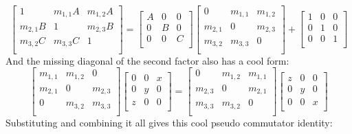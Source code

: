 \[
	\begin{bmatrix}
		1&m_{1,1}A&m_{1,2}A\\
		m_{2,1}B&1&m_{2,3}B\\
		m_{3,2}C&m_{3,3}C&1\\
	\end{bmatrix}
	=
	\begin{bmatrix}
		A&0&0\\
		0&B&0\\
		0&0&C\\
	\end{bmatrix}
	\begin{bmatrix}
		0&m_{1,1}&m_{1,2}\\
		m_{2,1}&0&m_{2,3}\\
		m_{3,2}&m_{3,3}&0\\
	\end{bmatrix}
	+
	\begin{bmatrix}
		1&0&0\\
		0&1&0\\
		0&0&1\\
	\end{bmatrix}
\]
And the missing diagonal of the second factor also has a cool form:
\[
	\begin{bmatrix}
		m_{1,1}&m_{1,2}&0\\
		m_{2,1}&0&m_{2,3}\\
		0&m_{3,2}&m_{3,3}\\
	\end{bmatrix}
	\begin{bmatrix}
		0&0&x\\
		0&y&0\\
		z&0&0\\
	\end{bmatrix}
	=
	\begin{bmatrix}
		0&m_{1,2}&m_{1,1}\\
		m_{2,3}&0&m_{2,1}\\
		m_{3,3}&m_{3,2}&0\\
	\end{bmatrix}
	\begin{bmatrix}
		z&0&0\\
		0&y&0\\
		0&0&x\\
	\end{bmatrix}
\]
Substituting and combining it all gives this cool pseudo commutator identity:
